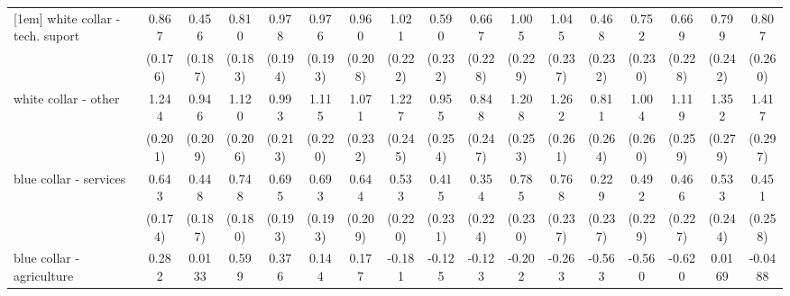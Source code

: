 {\begin{tabular}{l*{16}{c}}
[1em]
white collar - tech. suport&       0.867\sym{***}&       0.456\sym{*}  &       0.810\sym{***}&       0.978\sym{***}&       0.976\sym{***}&       0.960\sym{***}&       1.021\sym{***}&       0.590\sym{*}  &       0.667\sym{**} &       1.005\sym{***}&       1.045\sym{***}&       0.468\sym{*}  &       0.752\sym{**} &       0.669\sym{**} &       0.799\sym{***}&       0.807\sym{**} \\
                    &     (0.176)         &     (0.187)         &     (0.183)         &     (0.194)         &     (0.193)         &     (0.208)         &     (0.222)         &     (0.232)         &     (0.228)         &     (0.229)         &     (0.237)         &     (0.232)         &     (0.230)         &     (0.228)         &     (0.242)         &     (0.260)         \\
[1em]
white collar - other&       1.244\sym{***}&       0.946\sym{***}&       1.120\sym{***}&       0.993\sym{***}&       1.115\sym{***}&       1.071\sym{***}&       1.227\sym{***}&       0.955\sym{***}&       0.848\sym{***}&       1.208\sym{***}&       1.262\sym{***}&       0.811\sym{**} &       1.004\sym{***}&       1.119\sym{***}&       1.352\sym{***}&       1.417\sym{***}\\
                    &     (0.201)         &     (0.209)         &     (0.206)         &     (0.213)         &     (0.220)         &     (0.232)         &     (0.245)         &     (0.254)         &     (0.247)         &     (0.253)         &     (0.261)         &     (0.264)         &     (0.260)         &     (0.259)         &     (0.279)         &     (0.297)         \\
[1em]
blue collar - services&       0.643\sym{***}&       0.448\sym{*}  &       0.748\sym{***}&       0.695\sym{***}&       0.693\sym{***}&       0.644\sym{**} &       0.533\sym{*}  &       0.415         &       0.354         &       0.785\sym{***}&       0.768\sym{**} &       0.229         &       0.492\sym{*}  &       0.466\sym{*}  &       0.533\sym{*}  &       0.451         \\
                    &     (0.174)         &     (0.187)         &     (0.180)         &     (0.193)         &     (0.193)         &     (0.209)         &     (0.220)         &     (0.231)         &     (0.224)         &     (0.230)         &     (0.237)         &     (0.237)         &     (0.229)         &     (0.227)         &     (0.244)         &     (0.258)         \\
[1em]
blue collar - agriculture&       0.282         &      0.0133         &       0.599\sym{*}  &       0.376         &       0.144         &       0.177         &      -0.181         &      -0.125         &      -0.123         &      -0.202         &      -0.263         &      -0.563         &      -0.560         &      -0.620         &      0.0169         &     -0.0488         \\

\end{tabular}}
